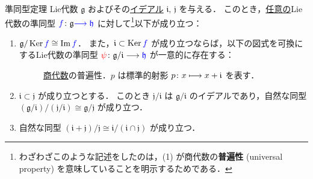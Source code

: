 \documentclass[rep_main]{subfiles}
\begin{document}
\begin{myprop}[label=prop:homo]{準同型定理}
    Lie代数 $\mathfrak{g}$ およびその\hyperref[def:ideal-LieAlg]{イデアル} $\mathfrak{i},\, \mathfrak{j}$ を与える．
    このとき，\underline{任意の}Lie代数の準同型 $\textcolor{blue}{f} \colon \mathfrak{g} \textcolor{blue}{\longrightarrow \mathfrak{h}}$ に対して\footnote{わざわざこのような記述をしたのは，(1) が商代数の\textbf{普遍性} (universal property) を意味していることを明示するためである．}以下が成り立つ：
    \begin{enumerate}
        \item $\mathfrak{g}/\operatorname{Ker} \textcolor{blue}{f} \cong \Im \textcolor{blue}{f}$．
        また，$\mathfrak{i} \subset \operatorname{Ker} \textcolor{blue}{f}$ が成り立つならば，以下の図式を可換にするLie代数の準同型 $\textcolor{red}{\psi} \colon \mathfrak{g}/\mathfrak{i} \longrightarrow \textcolor{blue}{\mathfrak{h}}$ が一意的に存在する：
        \begin{figure}[H]
            \centering
            \caption{\hyperref[def:quotient-LieAlg]{商代数}の普遍性．$p$ は標準的射影 $p \colon x \longmapsto x + \mathfrak{i}$ を表す．}
            \label{cmtd:1st-homo}
        \end{figure}%
        \item $\mathfrak{i} \subset \mathfrak{j}$ が成り立つとする．
        このとき $\mathfrak{j}/\mathfrak{i}$ は $\mathfrak{g}/\mathfrak{i}$ のイデアルであり，自然な同型 $(\mathfrak{g}/\mathfrak{i})/(\mathfrak{j}/\mathfrak{i}) \cong \mathfrak{g} / \mathfrak{j}$ が成り立つ．
        \item 自然な同型 $(\mathfrak{i} + \mathfrak{j}) / \mathfrak{j} \cong \mathfrak{i} / (\mathfrak{i} \cap \mathfrak{j})$ が成り立つ．
    \end{enumerate}
\end{myprop}
\end{document}
